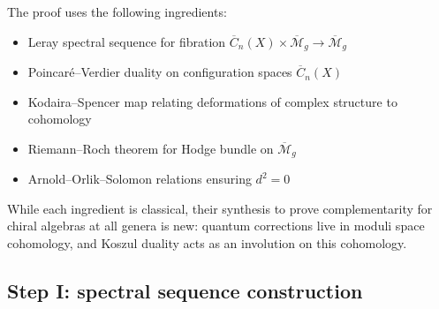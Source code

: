 The proof uses the following ingredients:
\begin{itemize}
\item Leray spectral sequence for fibration $\overline{C}_n(X) \times \overline{
\mathcal{M}}_g \to \overline{\mathcal{M}}_g$
\item Poincaré--Verdier duality on configuration spaces $\overline{C}_n(X)$
\item Kodaira--Spencer map relating deformations of complex structure to cohomology
\item Riemann--Roch theorem for Hodge bundle on $\overline{\mathcal{M}}_g$
\item Arnold--Orlik--Solomon relations ensuring $d^2 = 0$
\end{itemize}

While each ingredient is classical, their synthesis to prove
complementarity for chiral algebras at all genera is new:
quantum corrections live in moduli space cohomology, and Koszul
duality acts as an involution on this cohomology.

\subsection{Step I: spectral sequence construction}

